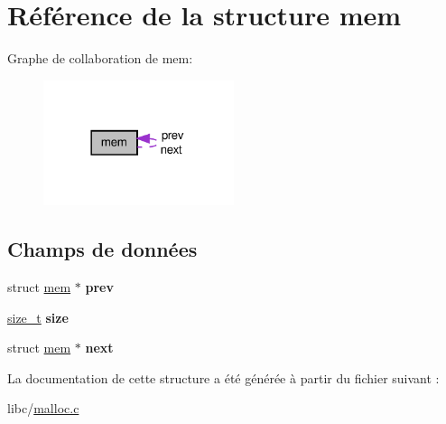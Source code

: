 \hypertarget{structmem}{\section{\-Référence de la structure mem}
\label{structmem}
}


\-Graphe de collaboration de mem\-:\nopagebreak
\begin{figure}[H]
\begin{center}
\leavevmode
\includegraphics[width=158pt]{structmem__coll__graph}
\end{center}
\end{figure}
\subsection*{\-Champs de données}
\begin{DoxyCompactItemize}
\item 
\hypertarget{structmem_a2edfcacfe26d9112b0e4f745c9f75cf7}{struct \hyperlink{structmem}{mem} $\ast$ {\bfseries prev}}\label{structmem_a2edfcacfe26d9112b0e4f745c9f75cf7}

\item 
\hypertarget{structmem_a7d695ebc3fafa769e7e7a75f1d232a18}{\hyperlink{types_8h_a29d85914ddff32967d85ada69854206d}{size\-\_\-t} {\bfseries size}}\label{structmem_a7d695ebc3fafa769e7e7a75f1d232a18}

\item 
\hypertarget{structmem_ad12075ee870ccc6f67f420f09ff37732}{struct \hyperlink{structmem}{mem} $\ast$ {\bfseries next}}\label{structmem_ad12075ee870ccc6f67f420f09ff37732}

\end{DoxyCompactItemize}


\-La documentation de cette structure a été générée à partir du fichier suivant \-:\begin{DoxyCompactItemize}
\item 
libc/\hyperlink{malloc_8c}{malloc.\-c}\end{DoxyCompactItemize}
